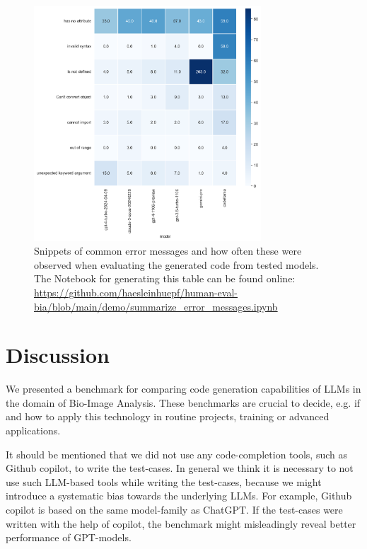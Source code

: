 \documentclass{ecai}
\begin{document}
\begin{figure}[h]
    \includegraphics[width=8.5cm]{error_counts_heatmap.png}
    \caption{Snippets of common error messages and how often these were observed when evaluating the generated code from tested models. The Notebook for generating this table can be found online: \url{https://github.com/haesleinhuepf/human-eval-bia/blob/main/demo/summarize_error_messages.ipynb} 
    \newline
    \newline}
    \label{fig:commonerrors}
    \end{figure}


\section{Discussion}

We presented a benchmark for comparing code generation capabilities of LLMs in the domain of Bio-Image Analysis. These benchmarks are crucial to decide, e.g. if and how to apply this technology in routine projects, training or advanced applications. 

It should be mentioned that we did not use any code-completion tools, such as Github copilot, to write the test-cases. In general we think it is necessary to not use such LLM-based tools while writing the test-cases, because we might introduce a systematic bias towards the underlying LLMs. For example, Github copilot is based on the same model-family as ChatGPT. If the test-cases were written with the help of copilot, the benchmark might misleadingly reveal better performance of GPT-models.
\end{document}

